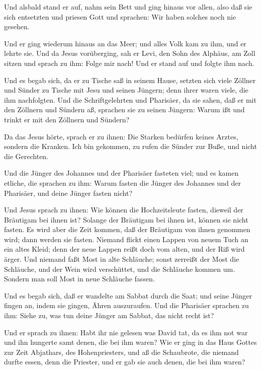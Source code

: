 Und alsbald stand er auf, nahm sein Bett und ging hinaus
vor allen, also daß sie sich entsetzten und priesen Gott und sprachen:
Wir haben solches noch nie gesehen.

 Und er ging wiederum hinaus an das Meer; und alles Volk
kam zu ihm, und er lehrte sie.  Und da Jesus vorüberging,
sah er Levi, den Sohn des Alphäus, am Zoll sitzen und sprach zu ihm:
Folge mir nach! Und er stand auf und folgte ihm nach.

 Und es begab sich, da er zu Tische saß in seinem Hause,
setzten sich viele Zöllner und Sünder zu Tische mit Jesu und seinen
Jüngern; denn ihrer waren viele, die ihm nachfolgten.  Und
die Schriftgelehrten und Pharisäer, da sie sahen, daß er mit den
Zöllnern und Sündern aß, sprachen sie zu seinen Jüngern: Warum ißt und
trinkt er mit den Zöllnern und Sündern?

 Da das Jesus hörte, sprach er zu ihnen: Die Starken
bedürfen keines Arztes, sondern die Kranken. Ich bin gekommen, zu rufen
die Sünder zur Buße, und nicht die Gerechten.

 Und die Jünger des Johannes und der Pharisäer fasteten
viel; und es kamen etliche, die sprachen zu ihm: Warum fasten die Jünger
des Johannes und der Pharisäer, und deine Jünger fasten nicht?

 Und Jesus sprach zu ihnen: Wie können die Hochzeitsleute
fasten, dieweil der Bräutigam bei ihnen ist? Solange der Bräutigam bei
ihnen ist, können sie nicht fasten.  Es wird aber die Zeit
kommen, daß der Bräutigam von ihnen genommen wird; dann werden sie
fasten.  Niemand flickt einen Lappen von neuem Tuch an ein
altes Kleid; denn der neue Lappen reißt doch vom alten, und der Riß wird
ärger.  Und niemand faßt Most in alte Schläuche; sonst
zerreißt der Most die Schläuche, und der Wein wird verschüttet, und die
Schläuche kommen um. Sondern man soll Most in neue Schläuche fassen.

 Und es begab sich, daß er wandelte am Sabbat durch die
Saat; und seine Jünger fingen an, indem sie gingen, Ähren auszuraufen.
 Und die Pharisäer sprachen zu ihm: Siehe zu, was tun deine
Jünger am Sabbat, das nicht recht ist?

 Und er sprach zu ihnen: Habt ihr nie gelesen was David
tat, da es ihm not war und ihn hungerte samt denen, die bei ihm waren?
 Wie er ging in das Haus Gottes zur Zeit Abjathars, des
Hohenpriesters, und aß die Schaubrote, die niemand durfte essen, denn
die Priester, und er gab sie auch denen, die bei ihm waren?


